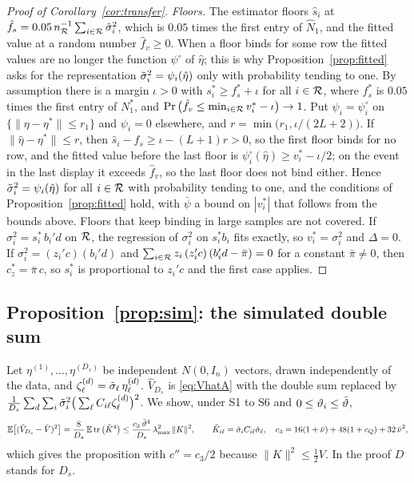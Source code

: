 \begin{proof}[Proof of Corollary~\ref{cor:transfer}]
\emph{Floors.} The estimator floors $\hat s_i$ at $\hat f_s=0.05\,n_{\mathcal{R}}^{-1}\sum_{i\in\mathcal{R}}\hat\sigma_i^2$, which is
$0.05$ times the first entry of $\hat N_1$, and the fitted value at a random number $\hat f_v\ge0$. When a floor
binds for some row the fitted values are no longer the function $\psi^\circ$ of $\hat\eta$; this is why
Proposition~\ref{prop:fitted} asks for the representation $\tilde\sigma_i^2=\psi_i(\hat\eta)$ only with probability tending
to one. By assumption there is a margin $\iota>0$ with $s_i^*\ge f_s^*+\iota$ for all $i\in\mathcal{R}$, where $f_s^*$ is
$0.05$ times the first entry of $N_1^*$, and $\Pr\big(\hat f_v\le\min_{i\in\mathcal{R}}v_i^*-\iota\big)\to1$. Put
$\psi_i=\psi_i^\circ$ on $\{\|\eta-\eta^*\|\le r_1\}$ and $\psi_i=0$ elsewhere, and
$r=\min\big(r_1,\iota/(2L+2)\big)$. If $\|\hat\eta-\eta^*\|\le r$, then $\hat s_i-\hat f_s\ge\iota-(L+1)r>0$, so
the first floor binds for no row, and the fitted value before the last floor is
$\psi_i^\circ(\hat\eta)\ge v_i^*-\iota/2$; on the event in the last display it exceeds $\hat f_v$, so the last
floor does not bind either. Hence $\tilde\sigma_i^2=\psi_i(\hat\eta)$ for all $i\in\mathcal{R}$ with probability tending to one,
and the conditions of Proposition~\ref{prop:fitted} hold, with $\bar\psi$ a bound on $|v_i^*|$ that follows from
the bounds above. Floors that keep binding in large samples are not covered. If $\sigma_i^2=s_i^*\,b_i'd$ on
$\mathcal{R}$, the regression of $\sigma_i^2$ on $s_i^*b_i$ fits exactly, so $v_i^*=\sigma_i^2$ and $\Delta=0$. If
$\sigma_i^2=(z_i'c)(b_i'd)$ and $\sum_{i\in\mathcal{R}}z_i\,(z_i'c)\,(b_i'd-\bar\pi)=0$ for a constant $\bar\pi\neq0$, then
$c_z^*=\bar\pi\,c$, so $s_i^*$ is proportional to $z_i'c$ and the first case applies.
\end{proof}

\subsection{Proposition~\ref{prop:sim}: the simulated double sum}

Let $\eta^{(1)},\dots,\eta^{(D_s)}$ be independent $N(0,I_n)$ vectors, drawn independently of the data, and
$\zeta^{(d)}_\ell=\tilde\sigma_\ell\,\eta^{(d)}_\ell$. $\hat V_{D_s}$ is \eqref{eq:VhatA} with the double sum replaced by
$\frac1{D_s}\sum_d\sum_i\tilde\sigma_i^2\big(\sum_\ell C_{i\ell}\zeta^{(d)}_\ell\big)^2$. We show, under S1 to S6 and
$0\le\vartheta_i\le\bar\vartheta$,
\[
\mathbb{E}\big[(\hat V_{D_s}-\hat V)^2\big]=\frac{8}{D_s}\,\mathbb{E}\operatorname{tr}\big(\tilde K^4\big)\le\frac{c_3\,\bar\vartheta^4}{D_s}\,\lambda_{\max}^2\,\|K\|^2,
\qquad \tilde K_{i\ell}=\tilde\sigma_iC_{i\ell}\tilde\sigma_\ell,\quad c_3=16(1+\bar\nu)+48(1+c_Q)+32\,\bar\nu^2 ,
\]
which gives the proposition with $c''=c_3/2$ because $\|K\|^2\le\frac12V$. In the proof $D$ stands for $D_s$.

